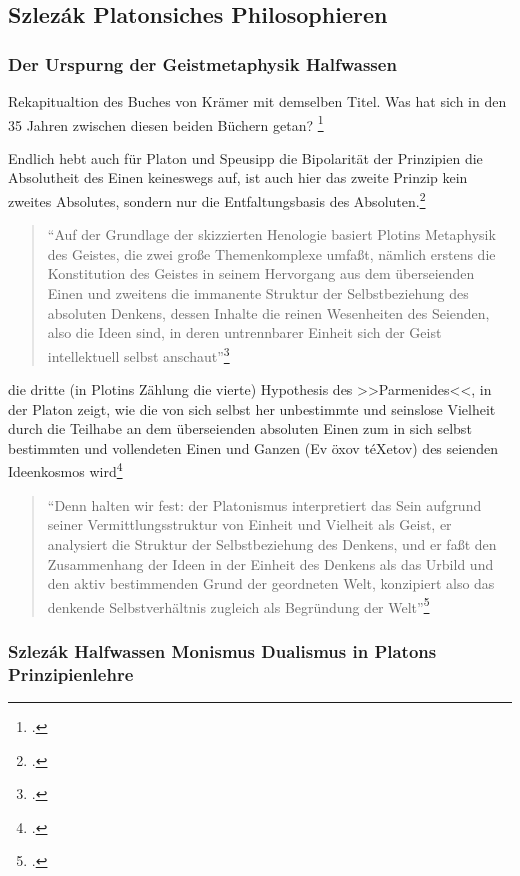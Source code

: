 \documentclass[12pt]{article}
\newcommand*{\zitatblock}[1]{%
    \begin{quote}
    \fontsize{10}{12}\selectfont
    \setlength{\parskip}{1.0em}
    #1
    \end{quote}
}
\begin{document}
\subsection*{Szlezák Platonsiches Philosophieren}
\subsubsection*{Der Urspurng der Geistmetaphysik Halfwassen}
Rekapitualtion des Buches von Krämer mit demselben Titel. Was hat sich in den 35 Jahren zwischen diesen beiden Büchern getan? \footcite[vgl.][S. 50]{HalfwassenGeistmetaphysik}

Endlich hebt auch für Platon und Speusipp die Bipolarität der Prinzipien die Absolutheit des Einen keineswegs auf, ist auch hier das zweite Prinzip kein zweites Absolutes, sondern nur die Entfaltungsbasis des Absoluten.\footcite[][S. 53]{HalfwassenGeistmetaphysik}

\zitatblock{\enquote{Auf der Grundlage der skizzierten Henologie basiert Plotins Metaphysik des Geistes, die zwei große Themenkomplexe umfaßt, nämlich erstens die Konstitution des Geistes in seinem Hervorgang aus dem überseienden Einen und zweitens die immanente Struktur der Selbstbeziehung des absoluten Denkens, dessen Inhalte die reinen Wesenheiten des Seienden, also die Ideen sind, in deren untrennbarer Einheit sich der Geist intellektuell selbst anschaut}\footcite[][S. 54]{HalfwassenGeistmetaphysik}}

die dritte (in Plotins Zählung die vierte) Hypothesis des >>Parmenides<<, in der Platon zeigt, wie die von sich selbst her unbestimmte und seinslose Vielheit durch die Teilhabe an dem überseienden absoluten Einen zum in sich selbst bestimmten und vollendeten Einen und Ganzen (Ev öxov téXetov) des seienden Ideenkosmos wird\footcite[vgl.][S. 54f.]{HalfwassenGeistmetaphysik}

\zitatblock{\enquote{Denn halten wir fest: der Platonismus interpretiert das Sein aufgrund seiner Vermittlungsstruktur von Einheit und Vielheit als Geist, er analysiert die Struktur der Selbstbeziehung des Denkens, und er faßt den Zusammenhang der Ideen in der Einheit des Denkens als das Urbild und den aktiv bestimmenden Grund der geordneten Welt, konzipiert also das denkende Selbstverhältnis zugleich als Begründung der Welt}\footcite[][S. 60]{HalfwassenGeistmetaphysik}}

\subsubsection*{Szlezák Halfwassen Monismus Dualismus in Platons Prinzipienlehre}
\end{document}
